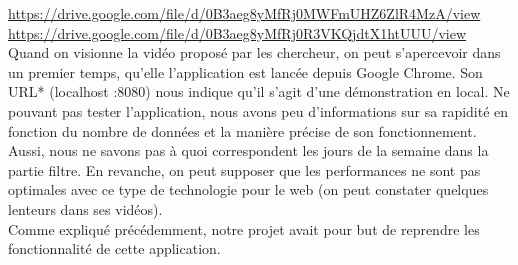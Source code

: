 \documentclass[12pt]{article}
\begin{document}
	\url{https://drive.google.com/file/d/0B3aeg8yMfRj0MWFmUHZ6ZlR4MzA/view}\\
	
	\url{https://drive.google.com/file/d/0B3aeg8yMfRj0R3VKQjdtX1htUUU/view}\\
	
	Quand on visionne la vidéo proposé par les chercheur, on peut s'apercevoir dans un premier
	temps, qu'elle l’application est lancée depuis Google Chrome. Son URL* (localhost :8080)
	nous indique qu’il s’agit d’une démonstration en local. Ne pouvant pas tester l’application,
	nous avons peu d’informations sur sa rapidité en fonction du nombre de données et la manière
	précise de son fonctionnement. Aussi, nous ne savons pas à quoi correspondent les jours de la
	semaine dans la partie filtre. En revanche, on peut supposer que les performances ne
	sont pas optimales avec ce type de technologie pour le web (on peut constater
	quelques lenteurs dans ses vidéos).\\
	Comme expliqué précédemment, notre projet avait pour
	but de reprendre les fonctionnalité de cette application.
	
\end{document}
